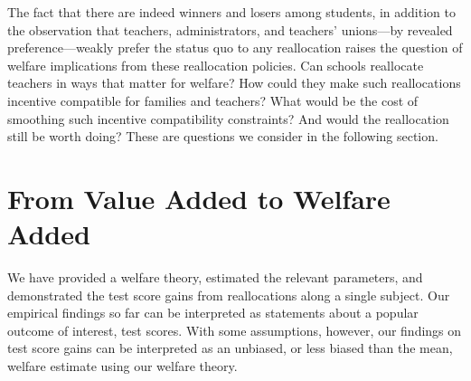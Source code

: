 \documentclass[12pt]{article}
\theoremstyle{definition}
\theoremstyle{definition}
\theoremstyle{definition}
\theoremstyle{definition}
\begin{document}
The fact that there are indeed winners and losers among students, in addition to the observation that teachers, administrators, and teachers' unions---by revealed preference---weakly prefer the status quo to any reallocation raises the question of welfare implications from these reallocation policies. Can schools reallocate teachers in ways that matter for welfare? How could they make such reallocations incentive compatible for families and teachers? What would be the cost of smoothing such incentive compatibility constraints? And would the reallocation still be worth doing? These are questions we consider in the following section.

\section{From Value Added to Welfare Added} \label{welfare}

We have provided a welfare theory, estimated the relevant parameters, and demonstrated the test score gains from reallocations along a single subject. Our empirical findings so far can be interpreted as statements about a popular outcome of interest, test scores. With some assumptions, however, our findings on test score gains can be interpreted as an unbiased, or less biased than the mean, welfare estimate using our welfare theory. 

\end{document}
